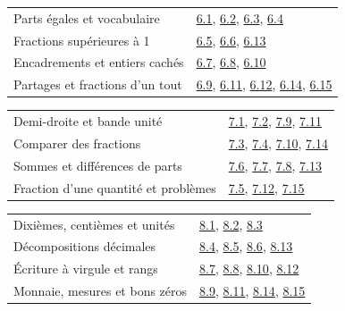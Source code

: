 \begin{tabularx}{\linewidth}{@{}Yl@{}}\toprule
Parts égales et vocabulaire & \hyperref[exo-6-1]{6.1}, \hyperref[exo-6-2]{6.2}, \hyperref[exo-6-3]{6.3}, \hyperref[exo-6-4]{6.4}\\[2mm]
Fractions supérieures à 1 & \hyperref[exo-6-5]{6.5}, \hyperref[exo-6-6]{6.6}, \hyperref[exo-6-13]{6.13}\\[2mm]
Encadrements et entiers cachés & \hyperref[exo-6-7]{6.7}, \hyperref[exo-6-8]{6.8}, \hyperref[exo-6-10]{6.10}\\[2mm]
Partages et fractions d’un tout & \hyperref[exo-6-9]{6.9}, \hyperref[exo-6-11]{6.11}, \hyperref[exo-6-12]{6.12}, \hyperref[exo-6-14]{6.14}, \hyperref[exo-6-15]{6.15}\\[2mm]
\bottomrule\end{tabularx}\par\vspace{4mm}
\clearpage
{}\fontsize{10}{13}\selectfont
{}\begin{tabularx}{\linewidth}{@{}Yl@{}}\toprule
Demi-droite et bande unité & \hyperref[exo-7-1]{7.1}, \hyperref[exo-7-2]{7.2}, \hyperref[exo-7-9]{7.9}, \hyperref[exo-7-11]{7.11}\\[2mm]
Comparer des fractions & \hyperref[exo-7-3]{7.3}, \hyperref[exo-7-4]{7.4}, \hyperref[exo-7-10]{7.10}, \hyperref[exo-7-14]{7.14}\\[2mm]
Sommes et différences de parts & \hyperref[exo-7-6]{7.6}, \hyperref[exo-7-7]{7.7}, \hyperref[exo-7-8]{7.8}, \hyperref[exo-7-13]{7.13}\\[2mm]
Fraction d’une quantité et problèmes & \hyperref[exo-7-5]{7.5}, \hyperref[exo-7-12]{7.12}, \hyperref[exo-7-15]{7.15}\\[2mm]
\bottomrule\end{tabularx}\par\vspace{4mm}
\begin{tabularx}{\linewidth}{@{}Yl@{}}\toprule
Dixièmes, centièmes et unités & \hyperref[exo-8-1]{8.1}, \hyperref[exo-8-2]{8.2}, \hyperref[exo-8-3]{8.3}\\[2mm]
Décompositions décimales & \hyperref[exo-8-4]{8.4}, \hyperref[exo-8-5]{8.5}, \hyperref[exo-8-6]{8.6}, \hyperref[exo-8-13]{8.13}\\[2mm]
Écriture à virgule et rangs & \hyperref[exo-8-7]{8.7}, \hyperref[exo-8-8]{8.8}, \hyperref[exo-8-10]{8.10}, \hyperref[exo-8-12]{8.12}\\[2mm]
Monnaie, mesures et bons zéros & \hyperref[exo-8-9]{8.9}, \hyperref[exo-8-11]{8.11}, \hyperref[exo-8-14]{8.14}, \hyperref[exo-8-15]{8.15}\\[2mm]
\bottomrule\end{tabularx}\par\vspace{4mm}
